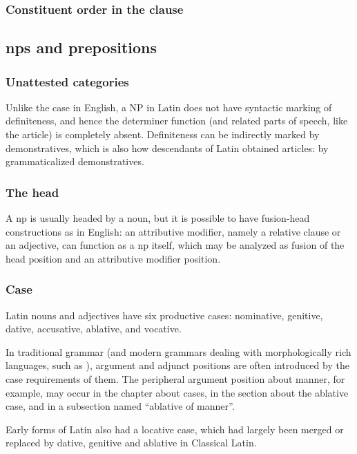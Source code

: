 \documentclass{article}
\newcommand*{\citechap}[1]{chap.~{#1}}
\begin{document}
\subsubsection{Constituent order in the clause}

\subsection{\Acl{np}s and prepositions}

\subsubsection{Unattested categories}

Unlike the case in English, a NP in Latin does not have syntactic marking of definiteness,
and hence the determiner function (and related parts of speech, like the article) is completely absent.
Definiteness can be indirectly marked by demonstratives,
which is also how descendants of Latin obtained articles: by grammaticalized demonstratives.

\subsubsection{The head}\label{sec:np-head-abs}

A \ac{np} is usually headed by a noun, but it is possible to have fusion-head constructions as in English:
an attributive modifier, namely a relative clause or an adjective, 
can function as a \ac{np} itself,
which may be analyzed as fusion of the head position and an attributive modifier position.

\subsubsection{Case}\label{sec:case-abs}

Latin nouns and adjectives have six productive cases:
nominative, genitive, dative, accusative, ablative, and vocative.

In traditional grammar (and modern grammars dealing with morphologically rich languages,
such as \citet[\citechap{8}]{jacques2021grammar}), 
argument and adjunct positions are often introduced by the case requirements of them.
The peripheral argument position about manner, for example,
may occur in the chapter about cases, in the section about the ablative case,
and in a subsection named ``ablative of manner''.

Early forms of Latin also had a locative case, which had largely been merged or replaced by 
dative, genitive and ablative in Classical Latin.
\end{document}
